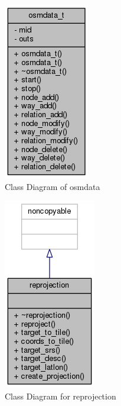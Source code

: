 \begin{figure}[t]
\centering
\includegraphics[scale=.85]{input/images/class_osmdata.png}
\caption{Class Diagram of osmdata}
\label{fig:classAnnotation__coll__graph}
\end{figure}

\begin{figure}
\centering
\includegraphics[scale=.85]{input/images/class_reprojection.png}
\caption{Class Diagram for reprojection}
\label{fig:classAnnotation__coll__graphh}
\end{figure}
